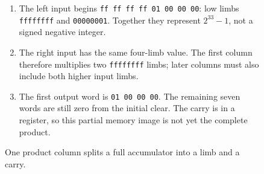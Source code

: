 \begin{figure}[htbp]
\begin{minipage}{\linewidth}
\begin{enumerate}
      \item The left input begins \texttt{ff ff ff ff 01 00 00 00}: low limbs \texttt{ffffffff} and \texttt{00000001}. Together they represent $2^{33}-1$, not a signed negative integer.
      \item The right input has the same four-limb value. The first column therefore multiplies two \texttt{ffffffff} limbs; later columns must also include both higher input limbs.
      \item The first output word is \texttt{01 00 00 00}. The remaining seven words are still zero from the initial clear. The carry is in a register, so this partial memory image is not yet the complete product.
    \end{enumerate}
  \end{minipage}
  \caption{One product column splits a full accumulator into a limb and a carry.}
  \label{capture:027-rsa-arithmetic-f01}
  \label{rsa-f01}
\end{figure}
\par

